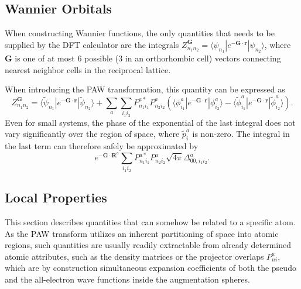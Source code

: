 \documentclass[a4paper]{article}
\newcommand{\s}[1]{\tilde{#1}}
\newcommand{\br}{\mathbf{r}}
\newcommand{\bR}{\mathbf{R}}
\newcommand{\bra}[1]{\langle #1 |}
\newcommand{\ket}[1]{| #1 \rangle}
\begin{document}
\subsection{Wannier Orbitals}
When constructing Wannier functions, the only quantities that needs to
be supplied by the DFT calculator are the integrals
$Z_{n_1n_2}^{\mathbf{G}} = \bra{\psi_{n_1}} e^{-\mathbf{G}\cdot \br}
\ket{\psi_{n_2}}$, where $\mathbf{G}$ is one of at most 6 possible (3
in an orthorhombic cell) vectors connecting nearest neighbor cells in
the reciprocal lattice.\cite{Thygesen2005,Ferretti2007}

When introducing the PAW transformation, this quantity can be
expressed as
%
\begin{equation*}
  Z_{n_1n_2}^{\mathbf{G}} = \bra{\s{\psi}_{n_1}} e^{-\mathbf{G}\cdot \br} \ket{\s{\psi}_{n_2}} + \sum_a \sum_{i_1i_2} P^{a*}_{n_1i_1} P^{a}_{n_2i_2} \left( \bra{\phi^a_{i_1}}e^{-\mathbf{G}\cdot \br}\ket{\phi^a_{i_2}} - \bra{\s{\phi}^a_{i_1}}e^{-\mathbf{G}\cdot \br}\ket{\s{\phi}^a_{i_2}} \right).
\end{equation*}
%
Even for small systems, the phase of the exponential of the last
integral does not vary significantly over the region of space, where
$\s{p}^a_i$ is non-zero. The integral in the last term can therefore
safely be approximated by
%
\begin{equation*}
  e^{-\mathbf{G}\cdot \bR^a} \sum_{i_1i_2} P^{a*}_{n_1i_1} P^{a}_{n_2i_2} \sqrt{4\pi}\Delta^a_{00,i_1i_2}.
\end{equation*}

\subsection{Local Properties}
This section describes quantities that can somehow be related to a
specific atom. As the PAW transform utilizes an inherent partitioning
of space into atomic regions, such quantities are usually readily
extractable from already determined atomic attributes, such as the
density matrices or the projector overlaps $P^a_{ni}$, which are by
construction simultaneous expansion coefficients of both the pseudo and the
all-electron wave functions inside the augmentation spheres.
\end{document}
